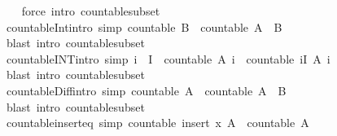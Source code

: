 \begin{isabellebody}
%
\isadelimproof
\ \ %
\endisadelimproof
%
\isatagproof
{}\isamarkupfalse%
\ {\isacharparenleft}force\ intro{\isacharcolon}\ countable{\isacharunderscore}subset{\isacharparenright}%
\endisatagproof
{\isafoldproof}%
%
\isadelimproof
\isanewline
%
\endisadelimproof
\isanewline
{}\isamarkupfalse%
\ countable{\isacharunderscore}Int{}{\isacharbrackleft}intro{\isacharcomma}\ simp{\isacharbrackright}{\isacharcolon}\ {\isachardoublequoteopen}countable\ B\ {\isasymLongrightarrow}\ countable\ {\isacharparenleft}A\ {\isasyminter}\ B{\isacharparenright}{\isachardoublequoteclose}\isanewline
%
\isadelimproof
\ \ %
\endisadelimproof
%
\isatagproof
{}\isamarkupfalse%
\ {\isacharparenleft}blast\ intro{\isacharcolon}\ countable{\isacharunderscore}subset{\isacharparenright}%
\endisatagproof
{\isafoldproof}%
%
\isadelimproof
\isanewline
%
\endisadelimproof
\isanewline
{}\isamarkupfalse%
\ countable{\isacharunderscore}INT{\isacharbrackleft}intro{\isacharcomma}\ simp{\isacharbrackright}{\isacharcolon}\ {\isachardoublequoteopen}i\ {\isasymin}\ I\ {\isasymLongrightarrow}\ countable\ {\isacharparenleft}A\ i{\isacharparenright}\ {\isasymLongrightarrow}\ countable\ {\isacharparenleft}{\isasymInter}i{\isasymin}I{\isachardot}\ A\ i{\isacharparenright}{\isachardoublequoteclose}\isanewline
%
\isadelimproof
\ \ %
\endisadelimproof
%
\isatagproof
{}\isamarkupfalse%
\ {\isacharparenleft}blast\ intro{\isacharcolon}\ countable{\isacharunderscore}subset{\isacharparenright}%
\endisatagproof
{\isafoldproof}%
%
\isadelimproof
\isanewline
%
\endisadelimproof
\isanewline
{}\isamarkupfalse%
\ countable{\isacharunderscore}Diff{\isacharbrackleft}intro{\isacharcomma}\ simp{\isacharbrackright}{\isacharcolon}\ {\isachardoublequoteopen}countable\ A\ {\isasymLongrightarrow}\ countable\ {\isacharparenleft}A\ {\isacharminus}\ B{\isacharparenright}{\isachardoublequoteclose}\isanewline
%
\isadelimproof
\ \ %
\endisadelimproof
%
\isatagproof
{}\isamarkupfalse%
\ {\isacharparenleft}blast\ intro{\isacharcolon}\ countable{\isacharunderscore}subset{\isacharparenright}%
\endisatagproof
{\isafoldproof}%
%
\isadelimproof
\isanewline
%
\endisadelimproof
\isanewline
{}\isamarkupfalse%
\ countable{\isacharunderscore}insert{\isacharunderscore}eq\ {\isacharbrackleft}simp{\isacharbrackright}{\isacharcolon}\ {\isachardoublequoteopen}countable\ {\isacharparenleft}insert\ x\ A{\isacharparenright}\ {\isacharequal}\ countable\ A{\isachardoublequoteclose}\isanewline
%
\isadelimproof
\ \ \ \ %
\endisadelimproof

\end{isabellebody}
